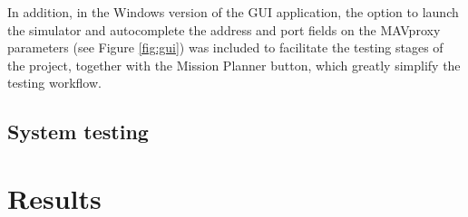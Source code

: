 In addition, in the Windows version of the GUI application, the option to launch the simulator and autocomplete the address and port fields on the MAVproxy parameters (see Figure \ref{fig:gui}) was included to facilitate the testing stages of the project, together with the Mission Planner button, which greatly simplify the testing workflow.


\subsection{System testing}


\section{Results}


